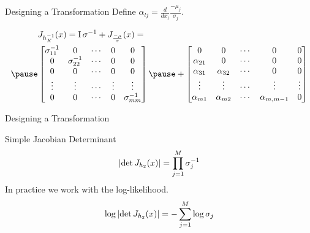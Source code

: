\begin{frame}{Designing a Transformation}
Define $ \alpha_{lj} = \frac{d}{dx_{l}}\frac{-\mu_{j}}{\sigma_{j}} $.
\begin{small}
\begin{equation*}
\begin{aligned}
&\jac{h_{K}^{-1}}{x} = \IMatrix\sigma^{-1} + J_{\frac{-\mu}{\sigma}}(x) = \\ \pause
&\begin{bmatrix}
\sigma^{-1}_{11} & 0 & \cdots & 0 & 0 \\
0 & \sigma^{-1}_{22} & \cdots & 0 & 0 \\
0 & 0 & \cdots & 0 & 0 \\
\vdots & \vdots & \cdots & \vdots & \vdots \\
0 & 0 & \cdots & 0 & \sigma^{-1}_{mm}
\end{bmatrix}
\pause
+
\begin{bmatrix}
0 & 0 & \cdots & 0 & 0 \\
\alpha_{21} & 0 & \cdots & 0 & 0 \\
\alpha_{31} & \alpha_{32} & \cdots & 0 & 0 \\
\vdots & \vdots & \cdots & \vdots & \vdots \\
\alpha_{m1} & \alpha_{m2} & \cdots & \alpha_{m,m-1} & 0
\end{bmatrix}
\end{aligned}
\end{equation*}
\end{small}
\end{frame}

\begin{frame}{Designing a Transformation}
\begin{block}{Simple Jacobian Determinant}
\begin{equation*}
\abs{\det J_{h_{2}}(x)} = \prod_{j=1}^{M}\sigma^{-1}_{j}
\end{equation*}
\pause
In practice we work with the log-likelihood.
\begin{equation*}
\log\abs{\det J_{h_{2}}(x)} = -\sum_{j=1}^{M}\log\sigma_{j}
\end{equation*}
\end{block}
\end{frame}

